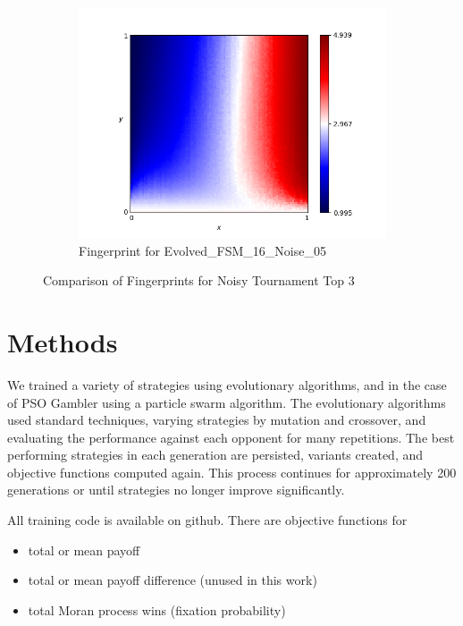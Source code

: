 \documentclass{article}
\begin{document}
\begin{figure}[!hbtp]
\begin{subfigure}[t]{.3\textwidth}
        \includegraphics[width=\textwidth]{./assets/Evolved_FSM_16_Noise_05.png}
        \caption{Fingerprint for Evolved\_FSM\_16\_Noise\_05}
    \end{subfigure}%

    \caption{Comparison of Fingerprints for Noisy Tournament Top 3}
    \label{fig:comparison_fingerprint_noisy}
\end{figure}


\section{Methods}

We trained a variety of strategies using evolutionary algorithms, and in the
case of PSO Gambler using a particle swarm algorithm. The evolutionary algorithms
used standard techniques, varying strategies by mutation and crossover, and
evaluating the performance against each opponent for many repetitions. The
best performing strategies in each generation are persisted, variants created,
and objective functions computed again. This process continues for approximately
200 generations or until strategies no longer improve significantly.


All training code is available on github. There are objective functions for
\begin{itemize}
 \item total or mean payoff
 \item total or mean payoff difference (unused in this work)
 \item total Moran process wins (fixation probability)
\end{itemize}
\end{document}
